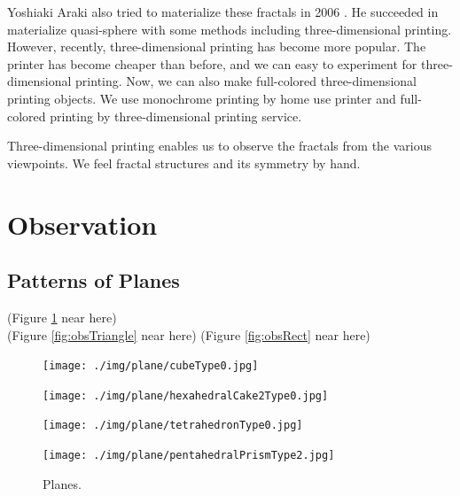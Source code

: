 \documentclass[suppldata, dvipdfmx]{interact}
\theoremstyle{plain}%
\theoremstyle{definition}
\theoremstyle{remark}
\theoremstyle{problemstyle}
\begin{document}
Yoshiaki Araki also tried to materialize these fractals in 2006
\cite{araki2006materializing}.
He succeeded in materialize quasi-sphere with some methods including
three-dimensional printing.
However, recently, three-dimensional printing has become more popular.
The printer has become cheaper than before, and we can easy to
experiment for three-dimensional printing.
Now, we can also make full-colored three-dimensional printing objects.
We use monochrome printing by home use printer and full-colored
printing by three-dimensional printing service.

Three-dimensional printing enables us to observe the fractals from the
various viewpoints.
We feel fractal structures and its symmetry by hand.

\section{Observation}

\subsection{Patterns of Planes}

\noindent(Figure \ref{fig:planes}
 near here)\\
(Figure \ref{fig:obsTriangle} near here)
(Figure \ref{fig:obsRect} near here)

\begin{figure}[h!tbp]
  \begin{minipage}[t]{0.23\textwidth}
   \centering
   \texttt{[image: ./img/plane/cubeType0.jpg]}
   \label{fig:planeCube}
  \end{minipage}
  \hspace*{\fill}
  \begin{minipage}[t]{0.23\textwidth}
   \centering
   \texttt{[image: ./img/plane/hexahedralCake2Type0.jpg]}
   \label{fig:planeCake}
  \end{minipage}
 \hspace*{\fill}
  \begin{minipage}[t]{0.23\textwidth}
   \centering
   \texttt{[image: ./img/plane/tetrahedronType0.jpg]}
   \label{fig:planeTetra}
  \end{minipage}
 \hspace*{\fill}
  \begin{minipage}[t]{0.23\textwidth}
   \centering
   \texttt{[image: ./img/plane/pentahedralPrismType2.jpg]}
   \label{fig:planePentaPrism}
  \end{minipage}
 \caption{Planes.}
 \label{fig:planes}
 \hspace*{\fill}
\end{figure}
\end{document}
